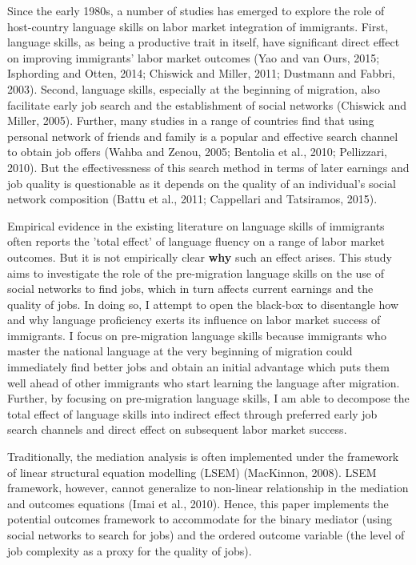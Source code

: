 \documentclass[12pt,a4paper]{article}
\begin{document}
Since the early 1980s, a number of studies has emerged to explore the role of host-country language skills on labor market integration of immigrants. First, language skills, as being a productive trait in itself, have significant direct effect on improving immigrants' labor market outcomes (Yao and van Ours, 2015; Isphording and Otten, 2014; Chiswick and Miller, 2011; Dustmann and Fabbri, 2003). Second, language skills, especially at the beginning of migration, also facilitate early job search and the establishment of social networks (Chiswick and Miller, 2005). Further, many studies in a range of countries find that using personal network of friends and family is a popular and effective search channel to obtain job offers (Wahba and Zenou, 2005; Bentolia et al., 2010; Pellizzari, 2010). But the effectivessness of this search method in terms of later earnings and job quality is questionable as it depends on the quality of an individual's social network composition (Battu et al., 2011; Cappellari and Tatsiramos, 2015).

Empirical evidence in the existing literature on language skills of immigrants often reports the 'total effect' of language fluency on a range of labor market outcomes. But it is not empirically clear \textbf{why} such an effect arises. This study aims to investigate the role of the pre-migration language skills on the use of social networks to find jobs, which in turn affects current earnings and the quality of jobs. In doing so, I attempt to open the black-box to disentangle how and why language proficiency exerts its influence on labor market success of immigrants. I focus on pre-migration language skills because immigrants who master the national language at the very beginning of migration could immediately find better jobs and obtain an initial advantage which puts them well ahead of other immigrants who start learning the language after migration. Further, by focusing on pre-migration language skills, I am able to decompose the total effect of language skills into indirect effect through preferred early job search channels and direct effect on subsequent labor market success.

Traditionally, the mediation analysis is often implemented under the framework of linear structural equation modelling (LSEM) (MacKinnon, 2008). LSEM framework, however, cannot generalize to non-linear relationship in the mediation and outcomes equations (Imai et al., 2010). Hence, this paper implements the potential outcomes framework to accommodate for the binary mediator (using social networks to search for jobs) and the ordered outcome variable (the level of job complexity as a proxy for the quality of jobs).
\end{document}
